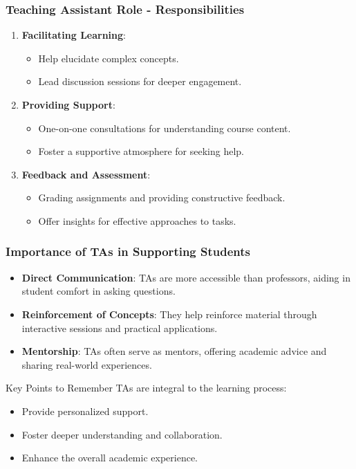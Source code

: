 \documentclass[aspectratio=169]{beamer}
\begin{document}
\begin{frame}[fragile]
    \frametitle{Teaching Assistant Role - Responsibilities}
    \begin{enumerate}
        \item \textbf{Facilitating Learning}:
            \begin{itemize}
                \item Help elucidate complex concepts.
                \item Lead discussion sessions for deeper engagement.
            \end{itemize}
            
        \item \textbf{Providing Support}:
            \begin{itemize}
                \item One-on-one consultations for understanding course content.
                \item Foster a supportive atmosphere for seeking help.
            \end{itemize}
            
        \item \textbf{Feedback and Assessment}:
            \begin{itemize}
                \item Grading assignments and providing constructive feedback.
                \item Offer insights for effective approaches to tasks.
            \end{itemize}
    \end{enumerate}
\end{frame}

\begin{frame}[fragile]
    \frametitle{Importance of TAs in Supporting Students}
    \begin{itemize}
        \item \textbf{Direct Communication}: TAs are more accessible than professors, aiding in student comfort in asking questions.
        
        \item \textbf{Reinforcement of Concepts}: They help reinforce material through interactive sessions and practical applications.
        
        \item \textbf{Mentorship}: TAs often serve as mentors, offering academic advice and sharing real-world experiences.
    \end{itemize}

    \begin{block}{Key Points to Remember}
        TAs are integral to the learning process:
        \begin{itemize}
            \item Provide personalized support.
            \item Foster deeper understanding and collaboration.
            \item Enhance the overall academic experience.
        \end{itemize}
    \end{block}
\end{frame}
\end{document}
